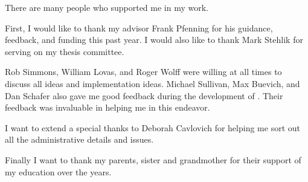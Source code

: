 There are many people who supported me in my work.

First, I would like to thank my advisor Frank Pfenning for his guidance,
feedback, and funding this past year. I would also like to thank Mark Stehlik
for serving on my thesis committee.

Rob Simmons, William Lovas, and Roger Wolff were willing at all times to discuss
all ideas and implementation ideas. Michael Sullivan, Max Buevich, and Dan
Schafer also gave me good feedback during the development of \langname{}. Their
feedback was invaluable in helping me in this endeavor.

I want to extend a special thanks to Deborah Cavlovich for helping me sort out
all the administrative details and issues.

Finally I want to thank my parents, sister and grandmother for their support of
my education over the years.
